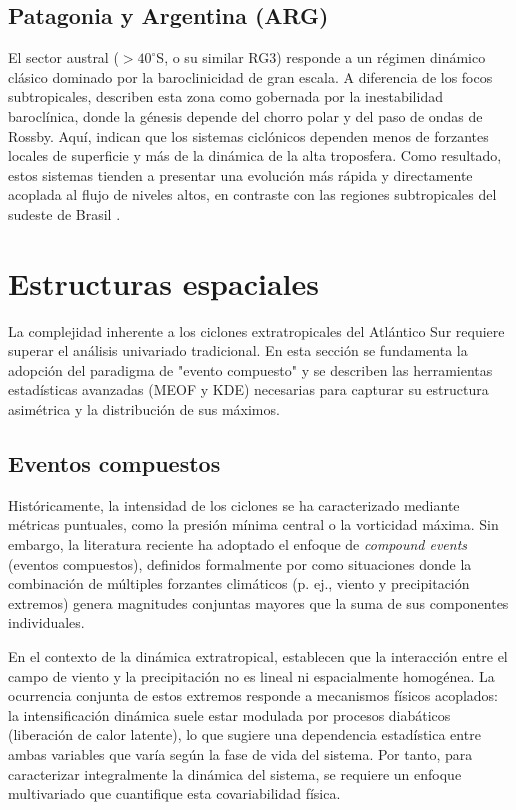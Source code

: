 \subsection{Patagonia y Argentina (ARG)}\label{subsec:mt_arg}
El sector austral ($>40^\circ$S, o su similar RG3) responde a un régimen dinámico clásico dominado por la baroclinicidad de gran escala. A diferencia de los focos subtropicales, \citet{hoskins2005new} describen esta zona como gobernada por la inestabilidad baroclínica, donde la génesis depende del chorro polar y del paso de ondas de Rossby. Aquí, \citet{simmonds2000variability} indican que los sistemas ciclónicos dependen menos de forzantes locales de superficie y más de la dinámica de la alta troposfera. Como resultado, estos sistemas tienden a presentar una evolución más rápida y directamente acoplada al flujo de niveles altos, en contraste con las regiones subtropicales del sudeste de Brasil \citep{vera2002cold}.
\section{Estructuras espaciales}\label{sec:mt_compuestos}

La complejidad inherente a los ciclones extratropicales del Atlántico Sur requiere superar el análisis univariado tradicional. En esta sección se fundamenta la adopción del paradigma de "evento compuesto" y se describen las herramientas estadísticas avanzadas (MEOF y KDE) necesarias para capturar su estructura asimétrica y la distribución de sus máximos.

\subsection{Eventos compuestos}\label{subsec:mt_compound_def}
Históricamente, la intensidad de los ciclones se ha caracterizado mediante métricas puntuales, como la presión mínima central o la vorticidad máxima. Sin embargo, la literatura reciente ha adoptado el enfoque de \textit{compound events} (eventos compuestos), definidos formalmente por \citet{zscheischler2018future} como situaciones donde la combinación de múltiples forzantes climáticos (p. ej., viento y precipitación extremos) genera magnitudes conjuntas mayores que la suma de sus componentes individuales.

En el contexto de la dinámica extratropical, \citet{chen2025characteristics} establecen que la interacción entre el campo de viento y la precipitación no es lineal ni espacialmente homogénea. La ocurrencia conjunta de estos extremos responde a mecanismos físicos acoplados: la intensificación dinámica suele estar modulada por procesos diabáticos (liberación de calor latente), lo que sugiere una dependencia estadística entre ambas variables que varía según la fase de vida del sistema. Por tanto, para caracterizar integralmente la dinámica del sistema, se requiere un enfoque multivariado que cuantifique esta covariabilidad física.

